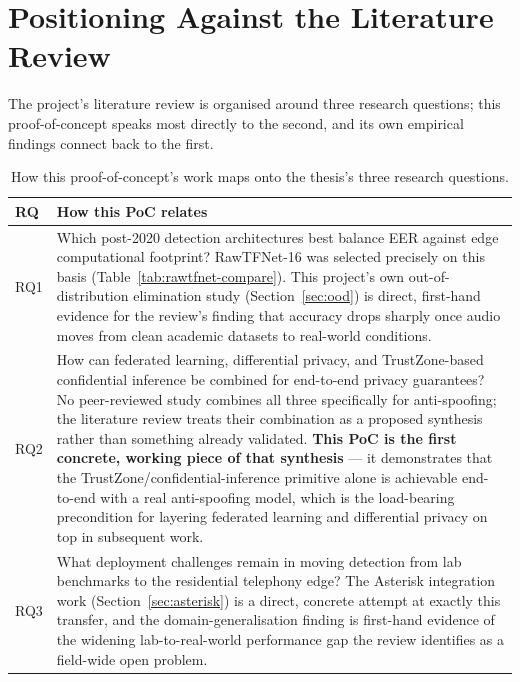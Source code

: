\documentclass[11pt,a4paper]{report}
\begin{document}
\chapter{Positioning Against the Literature Review}
\label{sec:rq}

The project's literature review is organised around three research questions; this proof-of-concept
speaks most directly to the second, and its own empirical findings connect back to the first.

\begin{table}[H]
\centering
\small
\begin{tabularx}{\textwidth}{@{}p{1.6cm}X@{}}
\toprule
\textbf{RQ} & \textbf{How this PoC relates} \\
\midrule
RQ1 & Which post-2020 detection architectures best balance EER against edge computational
footprint? RawTFNet-16 was selected precisely on this basis (Table~\ref{tab:rawtfnet-compare}).
This project's own out-of-distribution elimination study (Section~\ref{sec:ood}) is direct,
first-hand evidence for the review's finding that accuracy drops sharply once audio moves from
clean academic datasets to real-world conditions. \\
RQ2 & How can federated learning, differential privacy, and TrustZone-based confidential inference
be combined for end-to-end privacy guarantees? No peer-reviewed study combines all three
specifically for anti-spoofing; the literature review treats their combination as a proposed
synthesis rather than something already validated. \textbf{This PoC is the first concrete,
working piece of that synthesis} --- it demonstrates that the TrustZone/confidential-inference
primitive alone is achievable end-to-end with a real anti-spoofing model, which is the load-bearing
precondition for layering federated learning and differential privacy on top in subsequent work. \\
RQ3 & What deployment challenges remain in moving detection from lab benchmarks to the residential
telephony edge? The Asterisk integration work (Section~\ref{sec:asterisk}) is a direct, concrete
attempt at exactly this transfer, and the domain-generalisation finding is first-hand evidence of
the widening lab-to-real-world performance gap the review identifies as a field-wide open problem.
\\
\bottomrule
\end{tabularx}
\caption{How this proof-of-concept's work maps onto the thesis's three research questions.}
\label{tab:rq}
\end{table}
\end{document}
